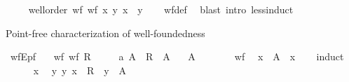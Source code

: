 \begin{isabellebody}
\ \ \isamarkupfalse%
%
\endisatagproof
{\isafoldproof}%
%
\isadelimproof
\isanewline
%
\endisadelimproof
\isanewline
{}\isamarkupfalse%
\ {\isacharparenleft}{\kern0pt}\ wellorder{\isacharparenright}{\kern0pt}\ wf{\isacharcolon}{\kern0pt}\ {\isachardoublequoteopen}wf\ {\isacharbraceleft}{\kern0pt}{\isacharparenleft}{\kern0pt}x{\isacharcomma}{\kern0pt}\ y{\isacharparenright}{\kern0pt}{\isachardot}{\kern0pt}\ x\ {\isacharless}{\kern0pt}\ y{\isacharbraceright}{\kern0pt}{\isachardoublequoteclose}\isanewline
%
\isadelimproof
\ \ %
\endisadelimproof
%
\isatagproof
{}\isamarkupfalse%
\ wf{\isacharunderscore}{\kern0pt}def\ \isamarkupfalse%
\ {\isacharparenleft}{\kern0pt}blast\ intro{\isacharcolon}{\kern0pt}\ less{\isacharunderscore}{\kern0pt}induct{\isacharparenright}{\kern0pt}%
\endisatagproof
{\isafoldproof}%
%
\isadelimproof
%
\endisadelimproof
%
\isadelimdocument
%
\endisadelimdocument
%
\isatagdocument
%
\isamarkuptrue%
%
\endisatagdocument
{\isafolddocument}%
%
\isadelimdocument
%
\endisadelimdocument
%
\begin{isamarkuptext}%
Point-free characterization of well-foundedness%
\end{isamarkuptext}\isamarkuptrue%
\isamarkupfalse%
\ wfE{\isacharunderscore}{\kern0pt}pf{\isacharcolon}{\kern0pt}\isanewline
\ \ \ wf{\isacharcolon}{\kern0pt}\ {\isachardoublequoteopen}wf\ R{\isachardoublequoteclose}\isanewline
\ \ \ \ \ a{\isacharcolon}{\kern0pt}\ {\isachardoublequoteopen}A\ {\isasymsubseteq}\ R\ {\isacharbackquote}{\kern0pt}{\isacharbackquote}{\kern0pt}\ A{\isachardoublequoteclose}\isanewline
\ \ \ {\isachardoublequoteopen}A\ {\isacharequal}{\kern0pt}\ {\isacharbraceleft}{\kern0pt}{\isacharbraceright}{\kern0pt}{\isachardoublequoteclose}\isanewline
%
\isadelimproof
%
\endisadelimproof
%
\isatagproof
{}\isamarkupfalse%
\ {\isacharminus}{\kern0pt}\isanewline
\ \ \isamarkupfalse%
\ wf\ \isamarkupfalse%
\ {\isachardoublequoteopen}x\ {\isasymnotin}\ A{\isachardoublequoteclose}\ \ x\isanewline
\ \ \isamarkupfalse%
\ induct\isanewline
\ \ \ \ \isamarkupfalse%
\ x\ \isamarkupfalse%
\ {\isachardoublequoteopen}{\isasymAnd}y{\isachardot}{\kern0pt}\ {\isacharparenleft}{\kern0pt}y{\isacharcomma}{\kern0pt}\ x{\isacharparenright}{\kern0pt}\ {\isasymin}\ R\ {\isasymLongrightarrow}\ y\ {\isasymnotin}\ A{\isachardoublequoteclose}\isanewline

\end{isabellebody}

